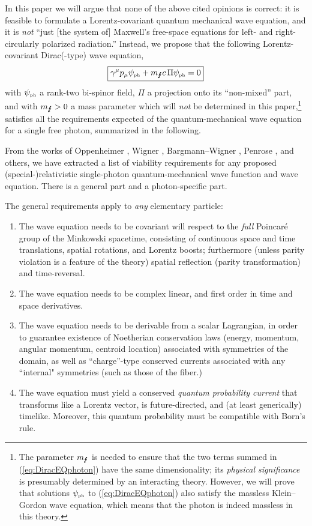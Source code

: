 \documentclass[11pt]{article}
\theoremstyle{definition}
\newcommand{\refeq}[1]{(\ref{#1})}
\numberwithin{equation}{section}
\newcommand{\beq}{\begin{equation}}
\newcommand{\eeq}{\end{equation}}
\newcommand{\psiPH}{{\psi_{\mbox{\rm\tiny ph}}}}
\newcommand{\mPH}{{m_{\mbox{\Lightning}}}}
\newcommand{\ga}{\gamma}
\begin{document}
 In this paper we will argue that none of the above cited opinions is correct: it is feasible to formulate
a Lorentz-covariant quantum mechanical wave equation, and it is \emph{not} ``just [the system of] Maxwell's
free-space equations for left- and right-circularly polarized radiation.'' 
 Instead, we propose that the following Lorentz-covariant Dirac(-type) wave equation, 
\beq \label{eq:DiracEQphoton} 
\boxed{\ga^\mu p_\mu \psiPH  + \mPH c\,\Pi \psiPH= 0}
\eeq
with $\psiPH$ a rank-two bi-spinor field, $\Pi$ a projection onto its ``non-mixed'' part,
and with $\mPH>0$ a mass parameter which will \emph{not} be determined in this paper,\footnote{The parameter $\mPH$ is {needed} 
  to ensure that the two terms summed in \refeq{eq:DiracEQphoton} have the same dimensionality; its \emph{physical significance}
  is presumably determined by an interacting theory.
  However, we will prove that solutions $\psiPH$ to \refeq{eq:DiracEQphoton} also satisfy the massless Klein--Gordon wave 
  equation, which means that the photon is indeed massless in this theory.}
satisfies all the requirements expected of the quantum-mechanical wave equation for a single free photon, 
summarized in the following.
 
From the works of Oppenheimer \cite{OppiPHOTON}, Wigner \cite{Wig1939}, Bargmann--Wigner \cite{BarWig1948}, 
Penrose \cite{Pen1976}, and others, we have extracted a list of
viability requirements for any proposed (special-)relativistic single-photon quantum-mechanical wave function and wave equation.
 There is a general part and a photon-specific part.
\smallskip

 The general requirements apply to {\em any} elementary particle:
\begin{enumerate}
\item The wave equation needs to be covariant will respect to the {\em full} Poincar\'e group of the Minkowski spacetime, consisting 
of continuous space and time translations, spatial rotations, and Lorentz boosts; 
furthermore (unless parity violation is a feature of the theory) spatial reflection (parity transformation) and time-reversal.
\item The wave equation needs to be complex linear, and first order in time and space derivatives.
\item The wave equation needs to be derivable from a scalar Lagrangian, in  order to guarantee existence of Noetherian conservation 
laws (energy, momentum,  angular momentum, centroid location) associated with symmetries of the domain, as well as ``charge''-type 
conserved currents associated with any ``internal" symmetries (such as those of the fiber.)
\item The wave equation must yield a conserved {\em quantum probability current} that transforms like a Lorentz 
vector, is future-directed, and (at least generically) timelike.
 Moreover, this quantum probability must be compatible with Born's rule.
\end{enumerate}
\end{document}
